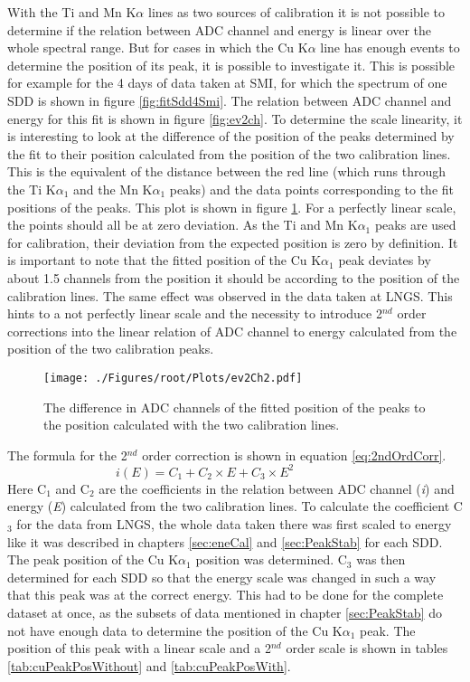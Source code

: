 With the Ti and Mn K$\alpha$ lines as two sources of calibration it is not possible to determine if the relation between ADC channel and energy is linear over the whole spectral range. But for cases in which the Cu K$\alpha$ line has enough events to determine the position of its peak, it is possible to investigate it. This is possible for example for the 4 days of data taken at SMI, for which the spectrum of one SDD is shown in figure \ref{fig:fitSdd4Smi}. The relation between ADC channel and energy for this fit is shown in figure \ref{fig:ev2ch}. To determine the scale linearity, it is interesting to look at the difference of the position of the peaks determined by the fit to their position calculated from the position of the two calibration lines. This is the equivalent of the distance between the red line (which runs through the Ti K$\alpha_{1}$ and the Mn K$\alpha_{1}$ peaks) and the data points corresponding to the fit positions of the peaks. This plot is shown in figure \ref{fig:scaleLin}. For a perfectly linear scale, the points should all be at zero deviation. As the Ti and Mn K$\alpha_{1}$ peaks are used for calibration, their deviation from the expected position is zero by definition. It is important to note that the fitted position of the Cu K$\alpha_{1}$ peak deviates by about 1.5 channels from the position it should be according to the position of the calibration lines. The same effect was observed in the data taken at LNGS. This hints to a not perfectly linear scale and the necessity to introduce 2$^{nd}$ order corrections into the linear relation of ADC channel to energy calculated from the position of the two calibration peaks. 
\begin{figure}[h]
 \centering
 \texttt{[image: ./Figures/root/Plots/ev2Ch2.pdf]}
 \caption{The difference in ADC channels of the fitted position of the peaks to the position calculated with the two calibration lines.}
 \label{fig:scaleLin}
\end{figure}
The formula for the 2$^{nd}$ order correction is shown in equation \ref{eq:2ndOrdCorr}.
\begin{equation}
 i (E) = C_{1} + C_{2} \times E + C_{3} \times E^{2} \hspace{2cm}
 \label{eq:2ndOrdCorr}
\end{equation} 
Here C$_{1}$ and C$_{2}$ are the coefficients in the relation between ADC channel (\textit{i}) and energy (\textit{E}) calculated from the two calibration lines. To calculate the coefficient C$_{3}$ for the data from LNGS, the whole data taken there was first scaled to energy like it was described in chapters \ref{sec:eneCal} and \ref{sec:PeakStab} for each SDD. The peak position of the Cu K$\alpha_{1}$ position was determined. C$_{3}$ was then determined for each SDD so that the energy scale was changed in such a way that this peak was at the correct energy. This had to be done for the complete dataset at once, as the subsets of data mentioned in chapter \ref{sec:PeakStab} do not have enough data to determine the position of the Cu K$\alpha_{1}$ peak. The position of this peak with a linear scale and a 2$^{nd}$ order scale is shown in tables \ref{tab:cuPeakPosWithout} and \ref{tab:cuPeakPosWith}.
